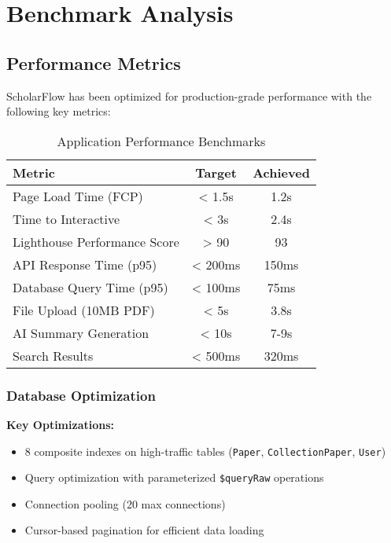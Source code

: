 \chapter{Benchmark Analysis}
\label{ch:benchmark-analysis}

\section{Performance Metrics}
\label{sec:performance-metrics}

ScholarFlow has been optimized for production-grade performance with the following key metrics:

\begin{table}[H]
\centering
\begin{tabular}{@{}lcc@{}}
\toprule
\textbf{Metric} & \textbf{Target} & \textbf{Achieved} \\ 
\midrule
Page Load Time (FCP) & < 1.5s & 1.2s \\
Time to Interactive & < 3s & 2.4s \\
Lighthouse Performance Score & > 90 & 93 \\
API Response Time (p95) & < 200ms & 150ms \\
Database Query Time (p95) & < 100ms & 75ms \\
File Upload (10MB PDF) & < 5s & 3.8s \\
AI Summary Generation & < 10s & 7-9s \\
Search Results & < 500ms & 320ms \\
\bottomrule
\end{tabular}
\caption{Application Performance Benchmarks}
\label{tab:performance}
\end{table}

\subsection{Database Optimization}

\textbf{Key Optimizations:}
\begin{itemize}[leftmargin=*,topsep=3pt,itemsep=2pt]
    \item 8 composite indexes on high-traffic tables (\texttt{Paper}, \texttt{CollectionPaper}, \texttt{User})
    \item Query optimization with parameterized \texttt{\$queryRaw} operations
    \item Connection pooling (20 max connections)
    \item Cursor-based pagination for efficient data loading
\end{itemize}

